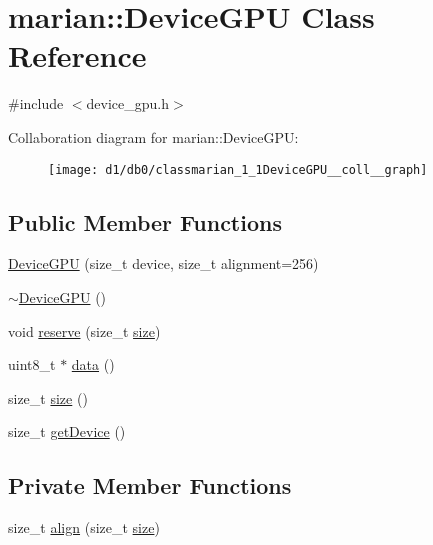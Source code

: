 \hypertarget{classmarian_1_1DeviceGPU}{}\section{marian\+:\+:Device\+G\+PU Class Reference}
\label{classmarian_1_1DeviceGPU}


{\ttfamily \#include $<$device\+\_\+gpu.\+h$>$}



Collaboration diagram for marian\+:\+:Device\+G\+PU\+:
\nopagebreak
\begin{figure}[H]
\begin{center}
\leavevmode
\texttt{[image: d1/db0/classmarian\_1\_1DeviceGPU\_\_coll\_\_graph]}
\end{center}
\end{figure}
\subsection*{Public Member Functions}
\begin{DoxyCompactItemize}
\item 
\hyperlink{classmarian_1_1DeviceGPU_aa73bbc00ebdf588045570fed6450eb35}{Device\+G\+PU} (size\+\_\+t device, size\+\_\+t alignment=256)
\item 
\hyperlink{classmarian_1_1DeviceGPU_adb73cacb9f5cc5db6f150cd0de8e8598}{$\sim$\+Device\+G\+PU} ()
\item 
void \hyperlink{classmarian_1_1DeviceGPU_ae11155ac0eb07f883ce502557d7ff324}{reserve} (size\+\_\+t \hyperlink{classmarian_1_1DeviceGPU_ae1eb5f0991b659f725a4973bf09c87b0}{size})
\item 
uint8\+\_\+t $\ast$ \hyperlink{classmarian_1_1DeviceGPU_a84dc43cc2d44dd8571ce92f7e29dca93}{data} ()
\item 
size\+\_\+t \hyperlink{classmarian_1_1DeviceGPU_ae1eb5f0991b659f725a4973bf09c87b0}{size} ()
\item 
size\+\_\+t \hyperlink{classmarian_1_1DeviceGPU_a8cf848d6d40bfcdffb34057e266c9a86}{get\+Device} ()
\end{DoxyCompactItemize}
\subsection*{Private Member Functions}
\begin{DoxyCompactItemize}
\item 
size\+\_\+t \hyperlink{classmarian_1_1DeviceGPU_a85b4d01e6012a14c738eb20c9d065aaa}{align} (size\+\_\+t \hyperlink{classmarian_1_1DeviceGPU_ae1eb5f0991b659f725a4973bf09c87b0}{size})
\end{DoxyCompactItemize}
